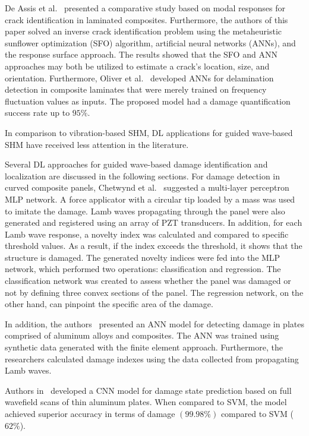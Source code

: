De Assis et al.~\cite{DeAssis2021} presented a comparative study based on modal responses for crack identification in laminated composites.
Furthermore, the authors of this paper solved an inverse crack identification problem using the metaheuristic sunflower optimization (SFO) algorithm, artificial neural networks (ANNs), and the response surface approach.
The results showed that the SFO and ANN approaches may both be utilized to estimate a crack's location, size, and orientation.
Furthermore, Oliver et al.~\cite{Oliver2021} developed ANNs for delamination detection in composite laminates that were merely trained on frequency fluctuation values as inputs.
The proposed model had a damage quantification success rate up to \(95\% \).

In comparison to vibration-based SHM, DL applications for guided wave-based SHM have received less attention in the literature.

Several DL approaches for guided wave-based damage identification and localization are discussed in the following sections.
For damage detection in curved composite panels, Chetwynd et al.~\cite{Chetwynd2008damage} suggested a multi-layer perceptron MLP network.
A force applicator with a circular tip loaded by a mass was used to imitate the damage.
Lamb waves propagating through the panel were also generated and registered using an array of PZT transducers.
In addition, for each Lamb wave response, a novelty index was calculated and compared to specific threshold values.
As a result, if the index exceeds the threshold, it shows that the structure is damaged.
The generated novelty indices were fed into the MLP network, which performed two operations: classification and regression.
The classification network was created to assess whether the panel was damaged or not by defining three convex sections of the panel.
The regression network, on the other hand, can pinpoint the specific area of the damage.

In addition, the authors~\cite{DeFenza2015} presented an ANN model for detecting damage in plates comprised of aluminum alloys and composites.
The ANN was trained using synthetic data generated with the finite element approach.
Furthermore, the researchers calculated damage indexes using the data collected from propagating Lamb waves.

Authors in~\cite{Melville2018} developed a CNN model for damage state prediction based on full wavefield scans of thin aluminum plates.
When compared to SVM, the model achieved superior accuracy in terms of damage $(99.98\%)$ compared to SVM ($62\%$).

